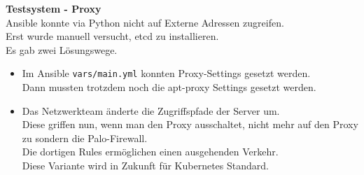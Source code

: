 \begin{flushleft}
\begin{description}
        \item \textbf{Testsystem - Proxy}\hfill \\Ansible konnte via Python nicht auf Externe Adressen zugreifen.\\Erst wurde manuell versucht, etcd zu installieren.\\Es gab zwei Lösungswege.
        \begin{itemize}
            \item Im \Gls{Ansible} \texttt{vars/main.yml} konnten Proxy-Settings gesetzt werden.\\Dann mussten trotzdem noch die apt-proxy Settings gesetzt werden.
            \item Das Netzwerkteam änderte die Zugriffspfade der Server um.\\Diese griffen nun, wenn man den Proxy ausschaltet, nicht mehr auf den Proxy zu sondern die Palo-Firewall.\\Die dortigen Rules ermöglichen einen ausgehenden Verkehr.\\Diese Variante wird in Zukunft für \Gls{Kubernetes} Standard.
        \end{itemize}
    \end{description}
\end{flushleft}
